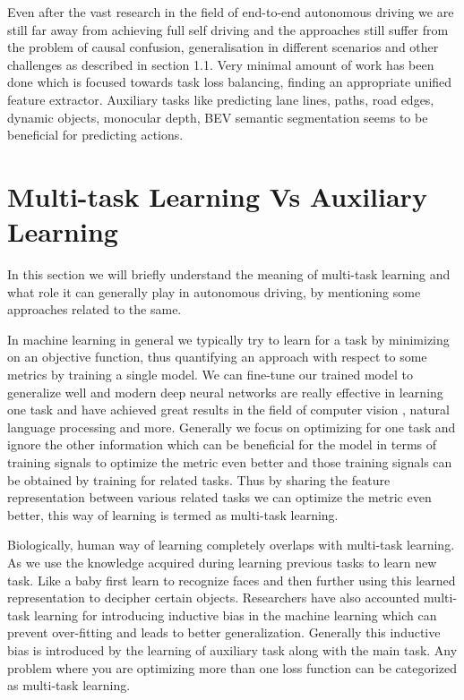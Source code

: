 Even after the vast research in the field of end-to-end autonomous driving we are still far away from achieving full self driving and the approaches still suffer from the problem of causal confusion, generalisation in different scenarios and other challenges as described in section 1.1. Very minimal amount of work has been done which is focused towards task loss balancing, finding an appropriate unified feature extractor. Auxiliary tasks like predicting lane lines, paths, road edges, dynamic objects, monocular depth, BEV semantic segmentation seems to be beneficial for predicting actions.

    \section{Multi-task Learning Vs Auxiliary Learning}
    
    In this section we will briefly understand the meaning of multi-task learning and what role it can generally play in autonomous driving, by mentioning some approaches related to the same. 
    
    In machine learning in general we typically try to learn for a task by minimizing on an objective function, thus quantifying an approach with respect to some metrics by training a single model. We can fine-tune our trained model to generalize well and modern deep neural networks are really effective in learning one task and have achieved great results in the field of computer vision \cite{} \cite{}, natural language processing \cite{} and more. Generally we focus on optimizing for one task and ignore the other information which can be beneficial for the model in terms of training signals to optimize the metric even better and those training signals can be obtained by training for related tasks. Thus by sharing the feature representation between various related tasks we can optimize the metric even better, this way of learning is termed as multi-task learning. 
    
    Biologically, human way of learning completely overlaps with multi-task learning. As we use the knowledge acquired during learning previous tasks to learn new task. Like a baby first learn to recognize faces and then further using this learned representation to decipher certain objects. Researchers have also accounted multi-task learning for introducing inductive bias in the machine learning which can prevent over-fitting and leads to better generalization. Generally this inductive bias is introduced by the learning of auxiliary task along with the main task. Any problem where you are optimizing more than one loss function can be categorized as multi-task learning. 
    
